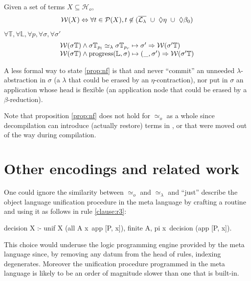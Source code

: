 \documentclass[sigconf,natbib=false,review]{acmart}
\newcommand{\UnifRel}{\ensuremath{\simeq}}
\newcommand{\Uo}{\ensuremath{\UnifRel_o}\xspace}
\newcommand{\Ue}{\ensuremath{\UnifRel_\lambda}\xspace}
\newcommand{\Ho}{\ensuremath{\mathcal{H}_o}\xspace}
\newcommand{\linkStore}{\ensuremath{\mathbb{L}}\xspace}
\newcommand{\hoUnifPb}{\ensuremath{\mathbb{T}}\xspace}
\begin{document}
\newcommand{\wellb}{\ensuremath{\mathcal{W}}\xspace}
\begin{definition}
Given a set of terms $X \subseteq \Ho{}$,
$$
\wellb(X) \Leftrightarrow \forall t \in \subterm{X}, t \not\in (\notllambda{} ~\cup~ \maybeeta{} ~\cup~ \maybebeta{})
$$
\end{definition}

\noindent

\begin{proposition}[\wellb{}-preservation of \hstep]\label{prop:nf}
$\forall \hoUnifPb, \forall \linkStore, \forall p, \forall \sigma, \forall \sigma'$
$$
\begin{array}{l}
\wellb(\sigma\hoUnifPb) \land
  \sigma\hoUnifPb_{p_l} \Ue \sigma\hoUnifPb_{p_r} \mapsto {\sigma'}
  \Rightarrow \wellb(\sigma' \hoUnifPb)\\
\wellb(\sigma\hoUnifPb) \land
  \progress(\linkStore,\sigma) \mapsto (\_,\sigma')
  \Rightarrow \wellb(\sigma' \hoUnifPb)
\end{array}
$$
\end{proposition}

\noindent
A less formal way to state \ref{prop:nf} is that \hstep{} and \progress never
``commit'' an unneeded $\lambda$-abstraction in $\sigma$ (a $\lambda$
that could be erased by an $\eta$-contraction),
nor put in $\sigma$ an application whose head is flexible
(an application node that could be erased by a $\beta$-reduction).

Note that proposition \ref{prop:nf} does not hold for \Uo{} as a whole
since decompilation can introduce (actually restore) terms in
\maybeeta, \maybebeta or \notllambda that were moved out of the way
during compilation.

\section{Other encodings and related work}\label{sec:encodings}

\noindent
One could ignore the similarity between \Uo{} and \Ue{} and ``just''
describe the object language unification procedure in the meta language by
crafting a  routine and using it as follows in
rule \ref{clause:r3}:

\begin{elpicode}
decision X :- unif X (all A x\ app [P, x]), finite A,
  pi x\ decision (app [P, x]).
\end{elpicode}

\noindent
This choice would underuse the logic programming engine provided by
the meta language since, by removing any datum from the head of rules,
indexing degenerates. Moreover the unification procedure 
programmed in the meta language is likely to be an order of magnitude
slower than one that is built-in.
\end{document}
